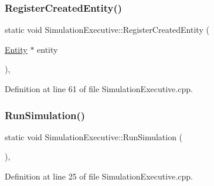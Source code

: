 \subsubsection{\texorpdfstring{Register\+Created\+Entity()}{RegisterCreatedEntity()}}
{\footnotesize\ttfamily static void Simulation\+Executive\+::\+Register\+Created\+Entity (\begin{DoxyParamCaption}\item[{\hyperlink{class_entity}{Entity} $\ast$}]{entity }\end{DoxyParamCaption})\hspace{0.3cm}{\ttfamily [inline]}, {\ttfamily [static]}}



Definition at line 61 of file Simulation\+Executive.\+cpp.

\mbox{\label{class_simulation_executive_aefcd760dfa5abac47f90871218f5a142}} 
\subsubsection{\texorpdfstring{Run\+Simulation()}{RunSimulation()}\hspace{0.1cm}{\footnotesize\ttfamily [1/2]}}
{\footnotesize\ttfamily static void Simulation\+Executive\+::\+Run\+Simulation (\begin{DoxyParamCaption}{ }\end{DoxyParamCaption})\hspace{0.3cm}{\ttfamily [inline]}, {\ttfamily [static]}}



Definition at line 25 of file Simulation\+Executive.\+cpp.

